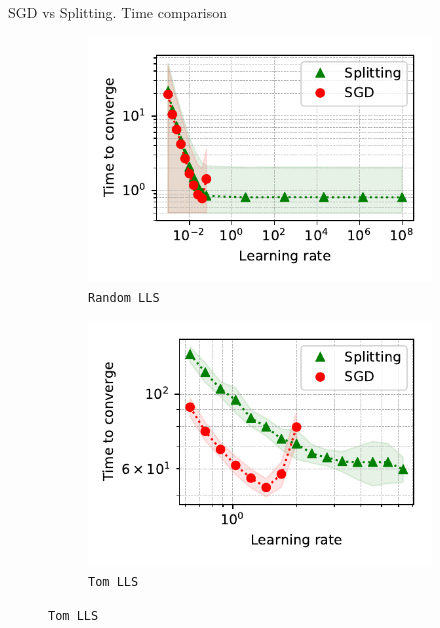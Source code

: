 \documentclass[aspectratio=169]{beamer}
\begin{document}
\begin{frame}{SGD vs Splitting. Time comparison}
\begin{figure}
    \begin{subfigure}[b]{0.35\textwidth}
            \centering
            \includegraphics[width=\linewidth]{LLS_time.pdf}
            \vspace{-25pt}
            \caption{{\small \texttt{Random LLS}}}
            \vspace{-22pt}
    \end{subfigure}%
    \begin{subfigure}[b]{0.35\textwidth}
            \centering
            \includegraphics[width=\linewidth]{LLS_tom_time.pdf}
            \vspace{-25pt}
            \caption{{\small \texttt{Tom LLS}}}

\end{subfigure}
\end{figure}
\end{frame}
\end{document}
